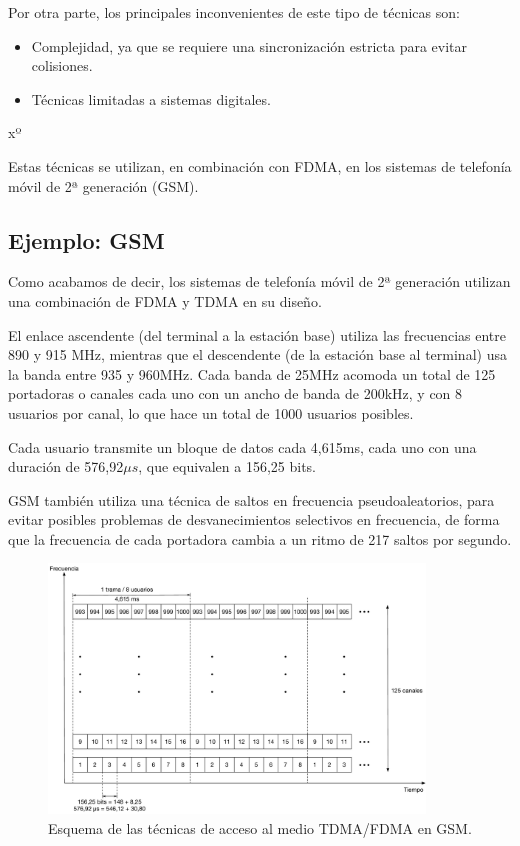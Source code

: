 \documentclass[es,apuntes]{uah}
\begin{document}
Por otra parte, los principales inconvenientes de este tipo de técnicas son:

\begin{itemize}
	\item Complejidad, ya que se requiere una sincronización estricta para evitar colisiones. 
	\item Técnicas limitadas a sistemas digitales.
\end{itemize}
xº

Estas técnicas se utilizan, en combinación con FDMA, en los sistemas de telefonía móvil de 2ª generación (GSM). 

\subsection{Ejemplo: GSM}

Como acabamos de decir, los sistemas de telefonía móvil de 2ª generación utilizan una combinación de FDMA y TDMA en su diseño. 

El enlace ascendente (del terminal a la estación base) utiliza las frecuencias entre 890 y 915 MHz, mientras que el descendente (de la estación base al terminal) usa la banda entre 935 y 960MHz. Cada banda de 25MHz acomoda un total de 125 portadoras o canales cada uno con un ancho de banda de 200kHz, y con 8 usuarios por canal, lo que hace un total de 1000 usuarios posibles.

Cada usuario transmite un bloque de datos cada 4,615ms, cada uno con una duración de 576,92$\mu s$, que equivalen a 156,25 bits. 

GSM también utiliza una técnica de saltos en frecuencia pseudoaleatorios, para evitar posibles problemas de desvanecimientos selectivos en frecuencia, de forma que la frecuencia de cada portadora cambia a un ritmo de 217 saltos por segundo. 
 
 \begin{figure}[h!]
	\centering\includegraphics[width=10cm]{./Figuras/AccesoAlMedioGSM}
	\caption{Esquema de las técnicas de acceso al medio TDMA/FDMA en GSM.}
	\label{fig:AccesoAlMedioGSM}
\end{figure}
\end{document}
